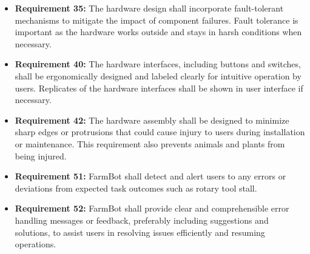\begin{itemize}
	\item \textbf{Requirement 35:} The hardware design shall incorporate fault-tolerant mechanisms to mitigate the impact of component failures. Fault tolerance is important as the hardware works outside and stays in harsh conditions when necessary.
	\item \textbf{Requirement 40:} The hardware interfaces, including buttons and switches, shall be ergonomically designed and labeled clearly for intuitive operation by users. Replicates of the hardware interfaces shall be shown in user interface if necessary.
	\item \textbf{Requirement 42:} The hardware assembly shall be designed to minimize sharp edges or protrusions that could cause injury to users during installation or maintenance. This requirement also prevents animals and plants from being injured.
	\item \textbf{Requirement 51: } FarmBot shall detect and alert users to any errors or deviations from expected task outcomes such as rotary tool stall.
	\item \textbf{Requirement 52: } FarmBot shall provide clear and comprehensible error handling messages or feedback, preferably including suggestions and solutions, to assist users in resolving issues efficiently and resuming operations.
\end{itemize}

	
